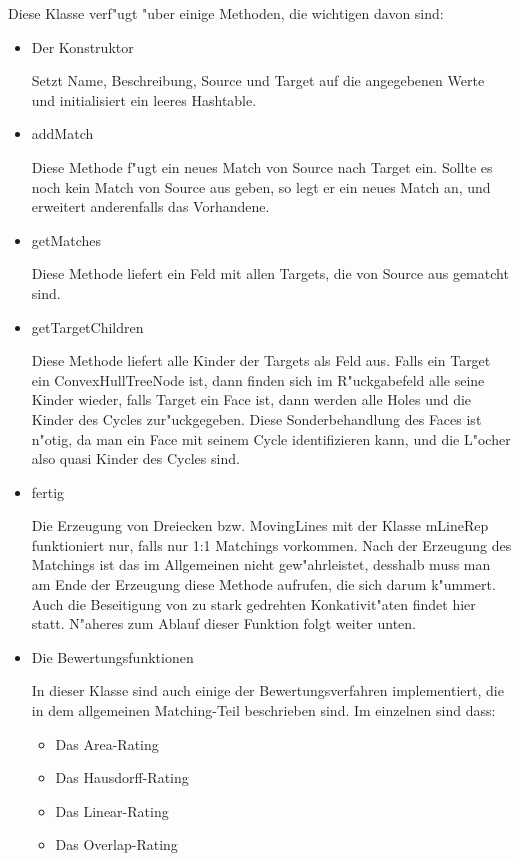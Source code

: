 \documentclass[a4paper,10pt,twoside]{scrreprt}
\begin{document}
Diese Klasse verf"ugt "uber einige Methoden, die wichtigen davon  sind:

\begin{itemize}

\item Der Konstruktor

Setzt Name, Beschreibung, Source und Target auf die angegebenen Werte und initialisiert ein leeres Hashtable.

\item addMatch

Diese Methode f"ugt ein neues Match von Source nach Target ein. Sollte es noch kein Match von Source aus geben, so legt er ein neues Match an, und erweitert anderenfalls das Vorhandene.

\item getMatches

Diese Methode liefert ein Feld mit allen Targets, die von Source aus gematcht sind.

\item getTargetChildren

Diese Methode liefert alle Kinder der Targets als Feld aus. Falls ein Target ein ConvexHullTreeNode ist, dann finden sich im R"uckgabefeld alle seine Kinder  wieder, falls Target ein Face ist, dann werden alle Holes und die Kinder des Cycles zur"uckgegeben. Diese Sonderbehandlung des Faces ist n"otig, da man ein Face mit seinem Cycle identifizieren kann, und die L"ocher also quasi Kinder des Cycles sind.

\item fertig

Die Erzeugung von Dreiecken bzw. MovingLines mit der Klasse mLineRep funktioniert nur, falls nur 1:1 Matchings vorkommen. Nach der Erzeugung des Matchings ist das im Allgemeinen nicht gew"ahrleistet, desshalb muss man am Ende der Erzeugung diese Methode aufrufen, die sich darum k"ummert. Auch die Beseitigung von zu stark gedrehten Konkativit"aten findet hier statt. N"aheres zum Ablauf dieser Funktion folgt weiter unten.

\item Die Bewertungsfunktionen

In dieser Klasse sind auch einige der Bewertungsverfahren implementiert, die in dem allgemeinen Matching-Teil beschrieben sind. Im einzelnen sind dass:
\begin{itemize}
\item Das Area-Rating
\item Das Hausdorff-Rating
\item Das Linear-Rating
\item Das Overlap-Rating
\end{itemize}

\end{itemize}
\end{document}
